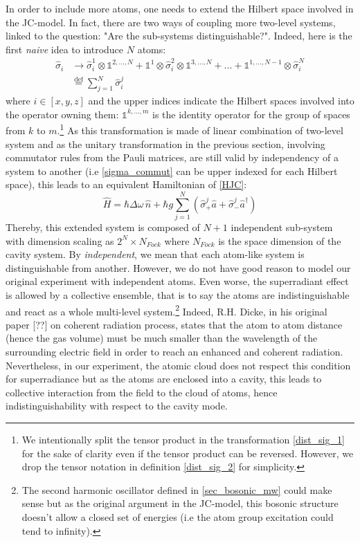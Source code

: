 \documentclass[11pt]{report}
\begin{document}
In order to include more atoms, one needs to extend the Hilbert space involved in the JC-model. In fact, there are two ways of coupling more two-level systems, linked to the question: "Are the sub-systems distinguishable?". Indeed, here is the first \textit{naive} idea to introduce $N$ atoms:
\begin{align}
\label{dist_sig_1}
\hat{\sigma}_i &\rightarrow \hat{\sigma}_i^1 \otimes \mathbb{1}^{2,...,N} + \mathbb{1}^{1} \otimes \hat{\sigma}_i^2 \otimes \mathbb{1}^{3,...,N} + ... + \mathbb{1}^{1,...,N-1} \otimes \hat{\sigma}_i^N\\
\label{dist_sig_2}
&\stackrel{\text{def}}{=} \sum_{j=1}^{N} \hat{\sigma}_i^j
\end{align}
where $i \in \left[x,y,z\right]$ and the upper indices indicate the Hilbert spaces involved into the operator owning them: $\mathbb{1}^{k,...,m}$ is the identity operator for the group of spaces from $k$ to $m$.\footnote{We intentionally split the tensor product in the transformation \eqref{dist_sig_1} for the sake of clarity even if the tensor product can be reversed. However, we drop the tensor notation in definition \eqref{dist_sig_2} for simplicity.}
As this transformation is made of linear combination of two-level system and as the unitary transformation in the previous section, involving commutator rules from the Pauli matrices, are still valid by independency of a system to another (i.e \eqref{sigma_commut} can be upper indexed for each Hilbert space), this leads to an equivalent Hamiltonian of \eqref{HJC}:
\begin{equation}
\hat{H} = \hbar\Delta\omega\,\hat{n} + \hbar g \sum_{j=1}^{N} \left(\hat{\sigma}_+^j \hat{a} + \hat{\sigma}_-^j \hat{a}^{\dag} \right)
\end{equation}
Thereby, this extended system is composed of $N+1$ independent sub-system with dimension scaling as $2^N \times N_{Fock}$ where $N_{Fock}$ is the space dimension of the cavity system. By \textit{independent}, we mean that each atom-like system is distinguishable from another. However, we do not have good reason to model our original experiment with independent atoms. Even worse, the superradiant effect is allowed by a collective ensemble, that is to say the atoms are indistinguishable and react as a whole multi-level system.\footnote{The second harmonic oscillator defined in \eqref{sec_bosonic_mw} could make sense but as the original argument in the JC-model, this bosonic structure doesn't allow a closed set of energies (i.e the atom group excitation could tend to infinity).} Indeed, R.H. Dicke, in his original paper [??] on coherent radiation process, states that the atom to atom distance (hence the gas volume) must be much smaller than the wavelength of the surrounding electric field in order to reach an enhanced and coherent radiation. Nevertheless, in our experiment, the atomic cloud does not respect this condition for superradiance but as the atoms are enclosed into a cavity, this leads to collective interaction from the field to the cloud of atoms, hence indistinguishability with respect to the cavity mode.
\end{document}
